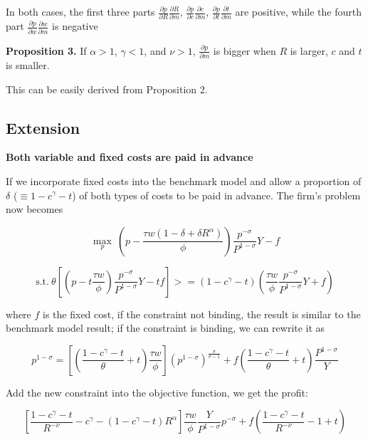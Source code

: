 \documentclass[12pt]{article}
\begin{document}
In both cases, the first three parts $\frac{\partial p}{\partial R}\frac{\partial R}{\partial m}$, $\frac{\partial p}{\partial c}\frac{\partial c}{\partial m}$, $\frac{\partial p}{\partial t}\frac{\partial t}{\partial m}$ are positive, while the fourth part $\frac{\partial p}{\partial w}\frac{\partial w}{\partial m} $ is negative



\textbf{Proposition 3.} If $\alpha>1$, $\gamma<1$, and $\nu>1$, $\frac{\partial p}{\partial m}$ is bigger when $R$ is larger, $c$ and $t$ is smaller.

This can be easily derived from Proposition 2.

\subsection{Extension} 

\textbf{Both variable and fixed costs are paid in advance}

If we incorporate fixed costs into the benchmark model and allow a proportion of $\delta$ ($\equiv 1-c^{\gamma}-t$) of both types of costs to be paid in advance. The firm's problem now becomes

$$
\max_{p} \ (p- \frac{\tau w(1-\delta+\delta R^\alpha)}{\phi}) \frac{p^{-\sigma}}{P^{1-\sigma}} Y-f
$$

$$
\text{s.t.} \ \theta [(p -t \frac{\tau w}{\phi}) \frac{p^{-\sigma}}{P^{1-\sigma}} Y -tf ]>=(1-c^\gamma-t) (\frac{\tau w}{\phi} \frac{p^{-\sigma}}{P^{1-\sigma}} Y+f)
$$

where $f$ is the fixed cost, if the constraint not binding, the result is similar to the benchmark model result; if the constraint is binding, we can rewrite it as 

$$
p^{1-\sigma}=[(\frac{1-c^{\gamma}-t}{\theta}+t)\frac{\tau w}{\phi}] (p^{1-\sigma})^{\frac{\sigma}{\sigma-1}}+f(\frac{1-c^{\gamma}-t}{\theta}+t)\frac{P^{1-\sigma}}{Y}
$$

Add the new constraint into the objective function, we get the profit: 

$$
[\frac{1-c^\gamma-t}{R^{-\nu}}-c^\gamma-(1-c^\gamma-t)R^{\alpha}]\frac{\tau w}{\phi} \frac{Y}{P^{1-\sigma}}p^{-\sigma}+f(\frac{1-c^\gamma-t}{R^{-\nu}}-1+t)
$$
\end{document}
